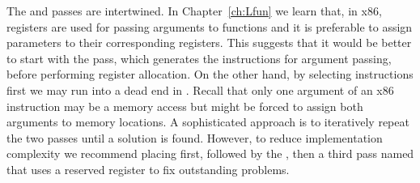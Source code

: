 \documentclass[7x10,nocrop]{TimesAPriori_MIT}%
\begin{document}
The  and  passes are
intertwined.
%
In Chapter~\ref{ch:Lfun} we learn that, in x86, registers are used for
passing arguments to functions and it is preferable to assign
parameters to their corresponding registers.  This suggests that it
would be better to start with the  pass,
which generates the instructions for argument passing, before
performing register allocation.
%
On the other hand, by selecting instructions first we may run into a
dead end in . Recall that only one argument of an
x86 instruction may be a memory access but  might
be forced to assign both arguments to memory locations.
%
A sophisticated approach is to iteratively repeat the two passes until
a solution is found. However, to reduce implementation complexity we
recommend placing  first, followed by the
, then a third pass named 
that uses a reserved register to fix outstanding problems.
\end{document}
